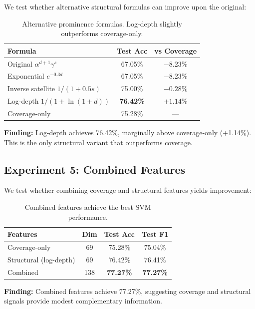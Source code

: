 \documentclass[11pt]{article}
\begin{document}
We test whether alternative structural formulas can improve upon the original:

\begin{table}[h]
\centering
\small
\begin{tabular}{lcc}
\toprule
\textbf{Formula} & \textbf{Test Acc} & \textbf{vs Coverage} \\
\midrule
Original $\alpha^{d+1}\gamma^s$ & 67.05\% & $-8.23\%$ \\
Exponential $e^{-0.3d}$ & 67.05\% & $-8.23\%$ \\
Inverse satellite $1/(1+0.5s)$ & 75.00\% & $-0.28\%$ \\
Log-depth $1/(1+\ln(1+d))$ & \textbf{76.42\%} & $+1.14\%$ \\
Coverage-only & 75.28\% & --- \\
\bottomrule
\end{tabular}
\caption{Alternative prominence formulas. Log-depth slightly outperforms coverage-only.}
\label{tab:formulas}
\end{table}

\textbf{Finding:} Log-depth achieves 76.42\%, marginally above coverage-only (+1.14\%). This is the only structural variant that outperforms coverage.

\subsection{Experiment 5: Combined Features}

We test whether combining coverage and structural features yields improvement:

\begin{table}[h]
\centering
\small
\begin{tabular}{lccc}
\toprule
\textbf{Features} & \textbf{Dim} & \textbf{Test Acc} & \textbf{Test F1} \\
\midrule
Coverage-only & 69 & 75.28\% & 75.04\% \\
Structural (log-depth) & 69 & 76.42\% & 76.41\% \\
Combined & 138 & \textbf{77.27\%} & \textbf{77.27\%} \\
\bottomrule
\end{tabular}
\caption{Combined features achieve the best SVM performance.}
\label{tab:combined}
\end{table}

\textbf{Finding:} Combined features achieve 77.27\%, suggesting coverage and structural signals provide modest complementary information.
\end{document}
